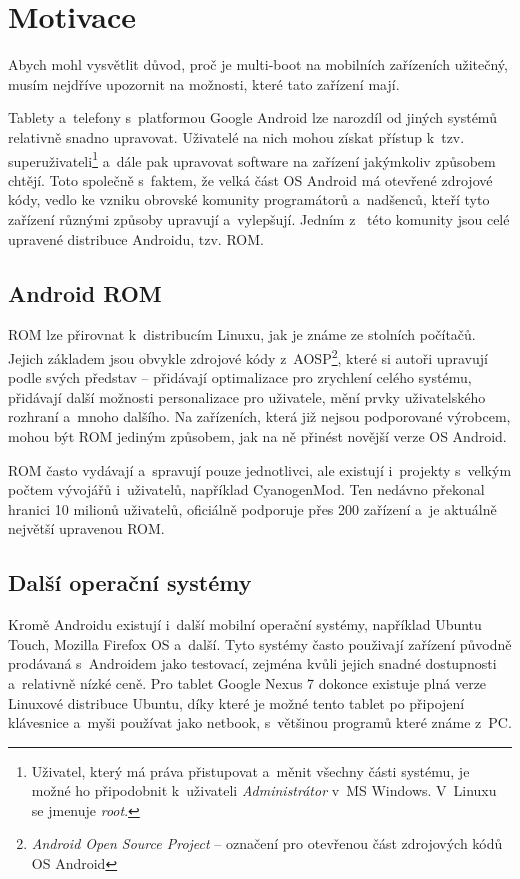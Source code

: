 \documentclass[12pt, a4paper, oneside]{article}
\newcommand{\It}{\textit}  %
\begin{document}
\newpage
\section{Motivace}
Abych mohl vysvětlit důvod, proč je multi-boot na mobilních zařízeních užitečný, musím nejdříve upozornit na možnosti, které tato zařízení mají.

Tablety a~telefony s~platformou Google Android lze narozdíl od jiných systémů relativně snadno upravovat. Uživatelé na nich mohou získat přístup k~tzv. superuživateli\footnote{Uživatel, který má práva přistupovat a~měnit všechny části systému, je možné ho připodobnit k~uživateli \It{Administrátor} v~MS Windows. V~Linuxu se jmenuje \It{root}.} a~dále pak upravovat software na zařízení jakýmkoliv způsobem chtějí. Toto společně s~faktem, že velká část OS Android má otevřené zdrojové kódy, vedlo ke vzniku obrovské komunity programátorů a~nadšenců, kteří tyto zařízení různými způsoby upravují a~vylepšují. Jedním z~ této komunity jsou celé upravené distribuce Androidu, tzv. ROM.

\subsection{Android ROM}
ROM lze přirovnat k~distribucím Linuxu, jak je známe ze stolních počítačů. Jejich základem jsou obvykle zdrojové kódy z~AOSP\cite{aosp}\footnote{\It{Android Open Source Project} -- označení pro otevřenou část zdrojových kódů OS Android}, které si autoři upravují podle svých představ -- přidávají optimalizace pro zrychlení celého systému, přidávají další možnosti personalizace pro uživatele, mění prvky uživatelského rozhraní a~mnoho dalšího. Na zařízeních, která již nejsou podporované výrobcem, mohou být ROM jediným způsobem, jak na ně přinést novější verze OS Android.

ROM často vydávají a~spravují pouze jednotlivci, ale existují i~projekty s~velkým počtem vývojářů i~uživatelů, například CyanogenMod\cite{CM}. Ten nedávno překonal hranici 10 milionů uživatelů, oficiálně podporuje přes 200 zařízení a~je aktuálně největší upravenou ROM.

\subsection{Další operační systémy}
Kromě Androidu existují i~další mobilní operační systémy, například Ubuntu Touch\cite{utouch}, Mozilla Firefox OS\cite{firefoxos} a~další. Tyto systémy často použivají zařízení původně prodávaná s~Androidem jako testovací, zejména kvůli jejich snadné dostupnosti a~relativně nízké ceně. Pro tablet Google Nexus 7 dokonce existuje plná verze Linuxové distribuce Ubuntu, díky které je možné tento tablet po připojení klávesnice a~myši používat jako netbook, s~většinou programů které známe z~PC.
\end{document}
